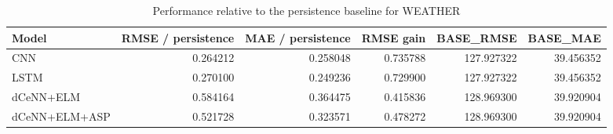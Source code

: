 \begin{table}
\caption{Performance relative to the persistence baseline for WEATHER}
\begin{tabular}{lrrrrr}
\toprule
Model & RMSE / persistence & MAE / persistence & RMSE gain & BASE\_RMSE & BASE\_MAE \\
\midrule
CNN & 0.264212 & 0.258048 & 0.735788 & 127.927322 & 39.456352 \\
LSTM & 0.270100 & 0.249236 & 0.729900 & 127.927322 & 39.456352 \\
dCeNN+ELM & 0.584164 & 0.364475 & 0.415836 & 128.969300 & 39.920904 \\
dCeNN+ELM+ASP & 0.521728 & 0.323571 & 0.478272 & 128.969300 & 39.920904 \\
\bottomrule
\end{tabular}
\end{table}
